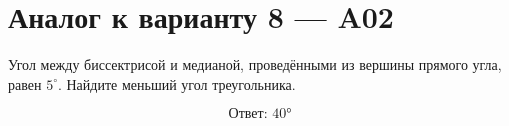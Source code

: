 


\section*{Аналог к варианту 8 — A02}
Угол между биссектрисой и медианой, проведёнными из вершины прямого угла, равен \(5^\circ\). Найдите меньший угол треугольника.
\begin{center}\figRightBisectorMedian\end{center}
\[\boxed{\text{Ответ: }40°}\]

